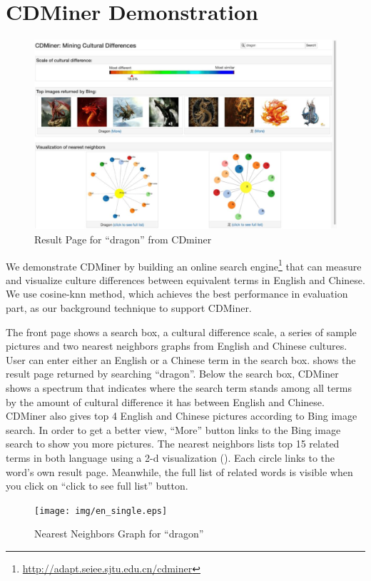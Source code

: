 \section{CDMiner Demonstration}
\label{sec:demo}

\begin{figure}[th]
\centering
\includegraphics[width=2\columnwidth]{img/final.eps}
\caption{Result Page for ``dragon'' from CDminer}
\label{fig:demo}
\end{figure}


We demonstrate CDMiner by building an online search engine\footnote{\url{http://adapt.seiee.sjtu.edu.cn/cdminer}} that can measure and visualize culture
differences between equivalent terms in English and Chinese. We use cosine-knn method,
which achieves the best performance in evaluation part,
as our background technique to support CDMiner.

The front page shows a search box, a cultural difference scale,
a series of sample pictures and
two nearest neighbors graphs from English and Chinese cultures.
User can enter either an English or a Chinese term in 
the search box. 
 shows the result page returned by 
searching ``dragon''.
Below the search box, 
CDMiner shows a spectrum that indicates where the search term stands
among all terms by the amount of cultural difference it has between
English and Chinese.
CDMiner also gives top 4 English and Chinese pictures according to Bing image search.
 In order to get a better view,
``More'' button links to the Bing image search to show you more pictures.
The nearest neighbors lists top 15 related terms in both language 
using a 2-d visualization (). 
Each circle links to the word's own result page.
Meanwhile, the full list of related words is visible when you 
click on ``click to see full list'' button. 

\begin{figure}[ht]
\centering
\texttt{[image: img/en\_single.eps]}
\caption{Nearest Neighbors Graph for ``dragon''}
\label{fig:neighbor}
\end{figure}


